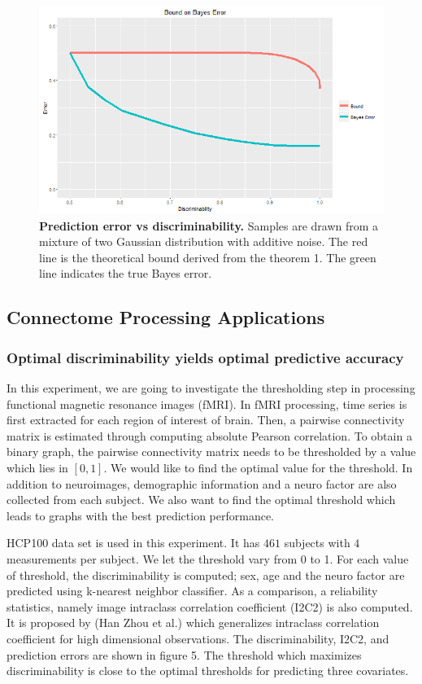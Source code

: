 \documentclass{article}
\begin{document}
\begin{figure}[ht!]
	\includegraphics[width=\linewidth]{../Figs/theo_plot.png}
	\caption{{\bf Prediction error vs discriminability.} Samples are drawn from a mixture of two Gaussian distribution with additive noise. The red line is the theoretical bound derived from the theorem 1. The green line indicates the true Bayes error. }
	\label{fig:1}
\end{figure}

\subsection{Connectome Processing Applications}

\subsubsection{Optimal discriminability yields optimal predictive accuracy}
In this experiment, we are going to investigate the thresholding step in processing functional magnetic resonance images (fMRI). In fMRI processing, time series is first extracted for each region of interest of brain. Then, a pairwise connectivity matrix is estimated through computing absolute Pearson correlation. To obtain a binary graph, the pairwise connectivity matrix needs to be thresholded by a value which lies in $[0,1]$. We would like to find the optimal value for the threshold. In addition to neuroimages, demographic information and a neuro factor are also collected from each subject. We also want to find the optimal threshold which leads to graphs with the best prediction performance.  

HCP100 data set is used in this experiment. It has $461$ subjects with $4$ measurements per subject. We let the threshold vary from 0 to 1. For each value of threshold, the discriminability is computed; sex, age and the neuro factor are predicted using k-nearest neighbor classifier. As a comparison, a reliability statistics, namely image intraclass correlation coefficient (I2C2) is also computed. It is proposed by (Han Zhou et al.) which generalizes intraclass correlation coefficient for high dimensional observations. The discriminability, I2C2, and prediction errors are shown in figure 5. The threshold which maximizes discriminability is close to the optimal thresholds for predicting three covariates. 
\end{document}
